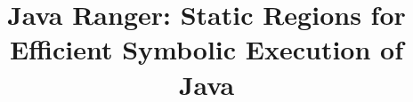 \documentclass[10pt,conference]{IEEEtran}
\begin{document}
\newcommand{\mike}[1]{\textcolor{red}{#1}}
\newcommand{\vaibhav}[1]{\textcolor{red}{#1}}
\newcommand{\soha}[1]{\textcolor{red}{#1}}
\newcommand{\smcc}[1]{\textcolor{red}{#1}}

\newcommand{\toolshort}{JR}
\newcommand{\tool}{Java Ranger}
\newcommand{\toolfull}{Java Ranger}

\newcommand{\newtext}[1]{\textcolor{blue}{#1}}
\newcommand{\region}{R}

\title{\tool: Static Regions for Efficient Symbolic Execution of Java
}



\maketitle
\end{document}
